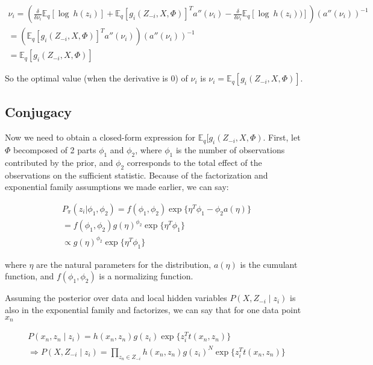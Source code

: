 \begin{align}
\label{expectation_of_g}
\nonumber \nu_i = \left( \frac{\delta}{\delta \nu_i} \mathbb{E}_q [\log\ h(z_i)] + \mathbb{E}_q[g_i(Z_{-i}, X, \Phi)]^Ta''(\nu_i) -  \frac{\delta}{\delta \nu_i} \mathbb{E}_q[\log\ h(z_i))] \right) \left(a''(\nu_i)\right)^{-1} \\
\nonumber =  \left( \mathbb{E}_q[g_i(Z_{-i}, X, \Phi)]^Ta''(\nu_i) \right) \left(a''(\nu_i)\right)^{-1} \\
= \mathbb{E}_q[g_i(Z_{-i}, X, \Phi)]
\end{align}

So the optimal value (when the derivative is $0$) of $\nu_i$ is $\nu_i = \mathbb{E}_q[g_i(Z_{-i}, X, \Phi)]$. 

\subsection{Conjugacy}

Now we need to obtain a closed-form expression for $\mathbb{E}_q[g_i(Z_{-i}, X, \Phi)$. First, let $\Phi$ becomposed of 2 parts $\phi_1$ and $\phi_2$, where $\phi_1$ is the number of observations contributed by the prior, and $\phi_2$ corresponds to the total effect of the observations on the sufficient statistic. Because of the factorization and exponential family assumptions we made earlier, we can say:

\begin{align}
\nonumber P_{\pi}(z_i | \phi_1, \phi_2) = f(\phi_1, \phi_2) \exp\big\{\eta^T\phi_1 - \phi_2 a(\eta)\big\} \\
\nonumber = f(\phi_1, \phi_2) g(\eta)^{\phi_2}\exp\big\{\eta^T\phi_1 \big\}\\
\propto g(\eta)^{\phi_2}\exp\big\{\eta^T\phi_1 \big\}
\end{align}

where $\eta$ are the natural parameters for the distribution, $a(\eta)$ is the cumulant function, and $f(\phi_1, \phi_2)$ is a normalizing function. 

Assuming the posterior over data and local hidden variables $P(X, Z_{-i} \mid z_i)$ is also in the exponential family and factorizes, we can say that for one data point $x_n$ 

\begin{align}
\nonumber P(x_n, z_n \mid z_i) = h(x_n, z_n) g(z_i)\exp\big\{z_i^T t(x_n, z_n)\big\} \\
\Rightarrow P(X,Z_{-i} \mid z_i) = \prod\limits_{z_n \in Z_{-i}}  h(x_n, z_n) g(z_i)^N \exp\big\{z_i^T t(x_n, z_n)\big\} 
\end{align}

